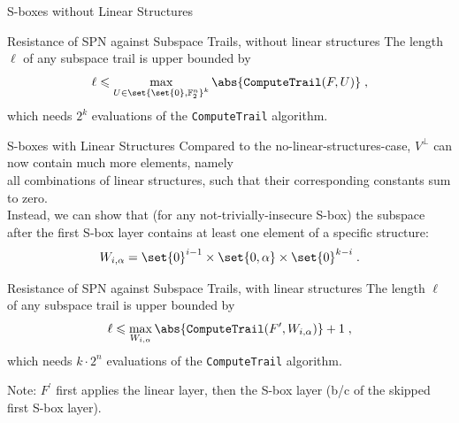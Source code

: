 \documentclass[%
    10pt,
    professionalfont,
    aspectratio=169,
    handout,
]{beamer}
\newcommand{\F}{\mathbb{F}}
\begin{document}
\begin{frame}{S-boxes without Linear Structures}
    \centering
    \begin{minipage}{0.72\textwidth}
    \begin{block}{Resistance of SPN against Subspace Trails, without linear structures}
    \centering
    The length $\ell$ of any subspace trail is upper bounded by
    \begin{equation*}
        \ell \leqslant \max_{U \in \set{\set{0}, \F_2^n}^k} \abs{\texttt{ComputeTrail}(F, U)}\;,
    \end{equation*}
    which needs $2^k$ evaluations of the \texttt{ComputeTrail} algorithm.
    \end{block}
    \end{minipage}
\end{frame}

\begin{frame}{S-boxes with Linear Structures}
    \centering
    Compared to the no-linear-structures-case, $V^\perp$ can now contain much more elements, namely\\
    all combinations of linear structures, such that their corresponding constants sum to zero.\\[1em]

    Instead, we can show that (for any not-trivially-insecure S-box) the subspace\\
    after the first S-box layer contains at least one element of a specific structure:
    \begin{equation*}
        W_{i,\alpha} = \set{0}^{i-1} \times \set{0, \alpha} \times \set{0}^{k-i}\;.
    \end{equation*}

    \begin{minipage}{0.69\textwidth}
    \begin{block}{Resistance of SPN against Subspace Trails, with linear structures}
    \centering
    The length $\ell$ of any subspace trail is upper bounded by
    \begin{equation*}
        \ell \leqslant \max_{W_{i,\alpha}} \abs{\texttt{ComputeTrail}(F^\prime, W_{i,\alpha})} + 1\;,
    \end{equation*}
    which needs $k \cdot 2^n$ evaluations of the \texttt{ComputeTrail} algorithm.
    \end{block}
    \end{minipage}

    \vspace{1em}
    Note: $F^\prime$ first applies the linear layer, then the S-box layer (b/c of the skipped first S-box layer).
\end{frame}
\end{document}
